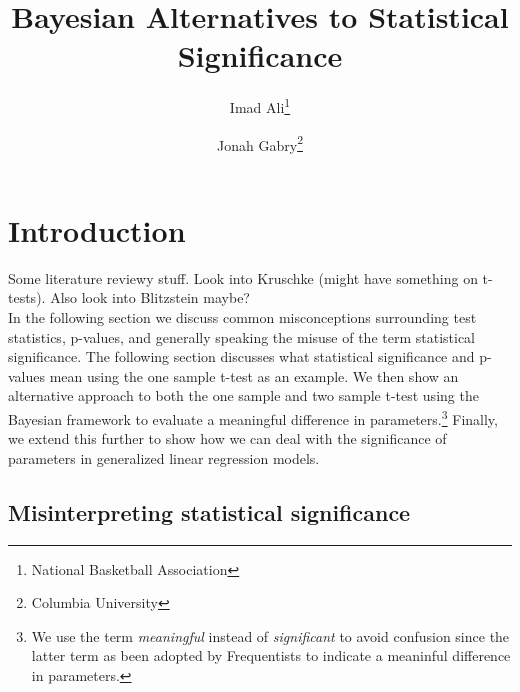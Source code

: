 \documentclass[12pt]{article}
\title{Bayesian Alternatives to Statistical Significance}
\author{Imad Ali\thanks{National Basketball Association} \and Jonah Gabry\thanks{Columbia University}}
\begin{document}
\maketitle
{}
\tableofcontents
\newpage

\def\ci{\perp\!\!\!\perp}
\def\ex{\mathbb{E}}
\def\prob{\mathbb{P}}
\def\ind{\mathbb{I}}
\def\grad{\triangledown}
\def\bigo{\mathcal{O}}

\section{Introduction}

Some literature reviewy stuff. Look into Kruschke (might have something on t-tests). Also look into Blitzstein maybe? \\

\noindent In the following section we discuss common misconceptions surrounding test statistics, p-values, and generally speaking the misuse of the term statistical significance. The following section discusses what statistical significance and p-values mean using the one sample t-test as an example. We then show an alternative approach to both the one sample and two sample t-test using the Bayesian framework to evaluate a meaningful difference in parameters.\footnote{We use the term \emph{meaningful} instead of \emph{significant} to avoid confusion since the latter term as been adopted by Frequentists to indicate a meaninful difference in parameters.} Finally, we extend this further to show how we can deal with the significance of parameters in generalized linear regression models. \\

\subsection{Misinterpreting statistical significance}
\end{document}
